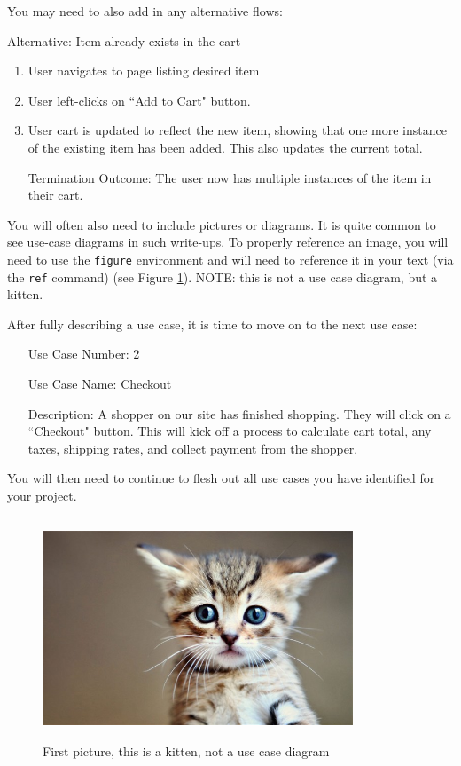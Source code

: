 \documentclass[10pt,conference,onecolumn,compsoc]{IEEEtran}
\begin{document}
You may need to also add in any alternative flows:

Alternative: Item already exists in the cart
\begin{enumerate}
\item User navigates to page listing desired item
\item User left-clicks on ``Add to Cart" button.
\item User cart is updated to reflect the new item, showing that one more instance of the existing item has been added.  This also updates the current total.
\item[Termination Outcome:] The user now has multiple instances of the item in their cart.
\end{enumerate}

You will often also need to include pictures or diagrams.  It is quite common to see use-case diagrams in such write-ups.  To properly reference an image, you will need to use the \texttt{figure} environment and will need to reference it in your text (via the \texttt{ref} command) (see Figure \ref{cat1}).  NOTE: this is not a use case diagram, but a kitten.

After fully describing a use case, it is time to move on to the next use case:

\begin{itemize}
\item[Use Case Number:] 2
\item[Use Case Name:] Checkout
\item[Description:] A shopper on our site has finished shopping.  They will click on a ``Checkout" button.  This will kick off a process to calculate cart total, any taxes, shipping rates, and collect payment from the shopper.

\end{itemize}

You will then need to continue to flesh out all use cases you have identified for your project.

\begin{figure}[ht!]
\includegraphics[height=250px, width=350px]{cat1.jpg}
\caption{First picture, this is a kitten, not a use case diagram}
\label{cat1}
\end{figure}
\end{document}
